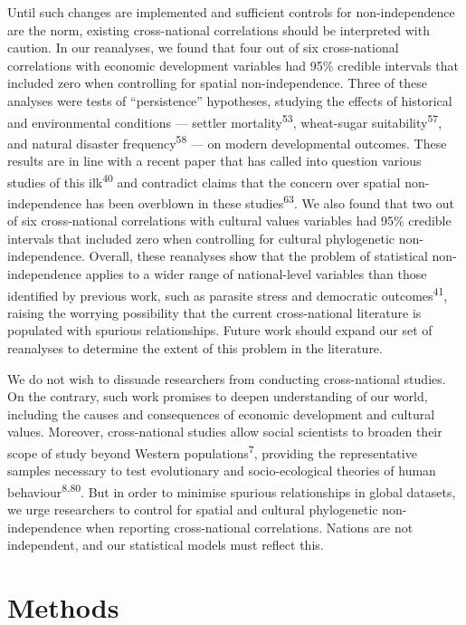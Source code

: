 \documentclass[
  man,floatsintext]{apa6}
\begin{document}
Until such changes are implemented and sufficient controls for non-independence are the norm, existing cross-national correlations should be interpreted with caution. In our reanalyses, we found that four out of six cross-national correlations with economic development variables had 95\% credible intervals that included zero when controlling for spatial non-independence. Three of these analyses were tests of ``persistence'' hypotheses, studying the effects of historical and environmental conditions --- settler mortality\textsuperscript{53}, wheat-sugar suitability\textsuperscript{57}, and natural disaster frequency\textsuperscript{58} --- on modern developmental outcomes. These results are in line with a recent paper that has called into question various studies of this ilk\textsuperscript{40} and contradict claims that the concern over spatial non-independence has been overblown in these studies\textsuperscript{63}. We also found that two out of six cross-national correlations with cultural values variables had 95\% credible intervals that included zero when controlling for cultural phylogenetic non-independence. Overall, these reanalyses show that the problem of statistical non-independence applies to a wider range of national-level variables than those identified by previous work, such as parasite stress and democratic outcomes\textsuperscript{41}, raising the worrying possibility that the current cross-national literature is populated with spurious relationships. Future work should expand our set of reanalyses to determine the extent of this problem in the literature.

We do not wish to dissuade researchers from conducting cross-national studies. On the contrary, such work promises to deepen understanding of our world, including the causes and consequences of economic development and cultural values. Moreover, cross-national studies allow social scientists to broaden their scope of study beyond Western populations\textsuperscript{7}, providing the representative samples necessary to test evolutionary and socio-ecological theories of human behaviour\textsuperscript{8,80}. But in order to minimise spurious relationships in global datasets, we urge researchers to control for spatial and cultural phylogenetic non-independence when reporting cross-national correlations. Nations are not independent, and our statistical models must reflect this.

\hypertarget{methods}{%
\section{Methods}\label{methods}}
\end{document}
